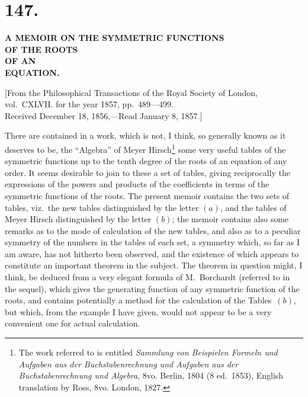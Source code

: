 \documentclass[11pt,a4paper]{article}
\begin{document}
\section*{147.}
\begin{center}
\Large\bfseries
A MEMOIR ON THE SYMMETRIC FUNCTIONS\\OF THE ROOTS\\OF AN\\EQUATION.
\end{center}

\begin{flushright}
\small
[From the Philosophical Transactions of the Royal Society of London,\\
vol.~CXLVII. for the year 1857, pp.~489---499.\\
Received December 18, 1856,---Read January 8, 1857.]
\end{flushright}

\normalsize
\setcounter{footnote}{0}

There are contained in a work, which is not, I think, so generally known
as it deserves to be, the ``Algebra'' of Meyer Hirsch\footnote{The work
referred to is entitled \textit{Sammlung von Beispielen Formeln und Aufgaben
aus der Buchstabenrechnung und Aufgaben aus der Buchstabenrechnung und
Algebra}, 8vo. Berlin, 1804 (8 ed.~1853), English translation by Ross, 8vo.
London, 1827.} some very useful tables of the symmetric functions up to the
tenth degree of the roots of an equation of any order. It seems desirable to
join to these a set of tables, giving reciprocally the expressions of the
powers and products of the coefficients in terms of the symmetric functions of
the roots. The present memoir contains the two sets of tables, viz.\ the new
tables distinguished by the letter $(a)$, and the tables of Meyer Hirsch
distinguished by the letter $(b)$; the memoir contains also some remarks as to
the mode of calculation of the new tables, and also as to a peculiar symmetry
of the numbers in the tables of each set, a symmetry which, so far as I am
aware, has not hitherto been observed, and the existence of which appears to
constitute an important theorem in the subject. The theorem in question might,
I think, be deduced from a very elegant formula of M.~Borchardt (referred to in
the sequel), which gives the generating function of any symmetric function of
the roots, and contains potentially a method for the calculation of the
Tables~$(b)$, but which, from the example I have given, would not appear to be
a very convenient one for actual calculation.
\end{document}
